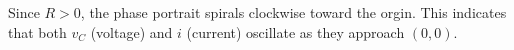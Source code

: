 \documentclass[preview]{standalone}
\begin{document}
\begin{center}
\raggedright
                    Since $R > 0$, the phase portrait spirals clockwise toward the orgin. This indicates \\
                    that both $v_C$ (voltage) and $i$ (current) oscillate as they approach $(0,0)$.
\end{center}
\end{document}
